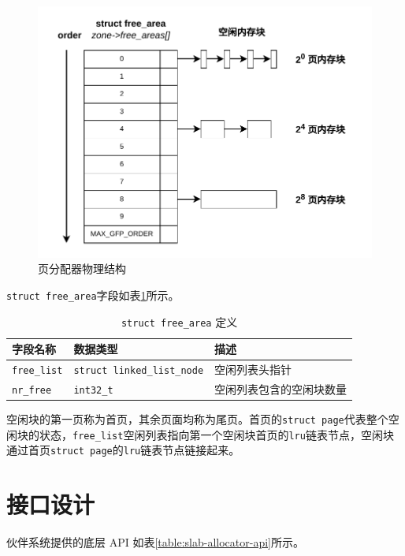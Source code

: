 \documentclass[AutoFakeBold]{LZUThesis}
\begin{document}
\begin{sloppypar}
\begin{figure}[H]
\centering
\includegraphics[scale=0.6]{images/free-area.drawio.pdf}
\caption{页分配器物理结构}
\label{figure:page-allocator-structure}
\end{figure}

\texttt{struct\ free\_area}字段如表\ref{table:struct-free-area-definition}所示。

\begin{longtable}[htb]{@{}lll@{}}
\caption{\texttt{struct\ free\_area} 定义}\label{table:struct-free-area-definition} \\
\toprule\noalign{}
字段名称 & 数据类型 & 描述 \\
\midrule\noalign{}
\endhead
\bottomrule\noalign{}
\endlastfoot
\texttt{free\_list} & \texttt{struct\ linked\_list\_node} &
空闲列表头指针 \\
\texttt{nr\_free} & \texttt{int32\_t} & 空闲列表包含的空闲块数量 \\
\end{longtable}

空闲块的第一页称为首页，其余页面均称为尾页。首页的\texttt{struct\ page}代表整个空闲块的状态，\texttt{free\_list}空闲列表指向第一个空闲块首页的\texttt{lru}链表节点，空闲块通过首页\texttt{struct\ page}的\texttt{lru}链表节点链接起来。


\section{接口设计}

伙伴系统提供的底层 API 如表\ref{table:slab-allocator-api}所示。


\end{sloppypar}
\end{document}
